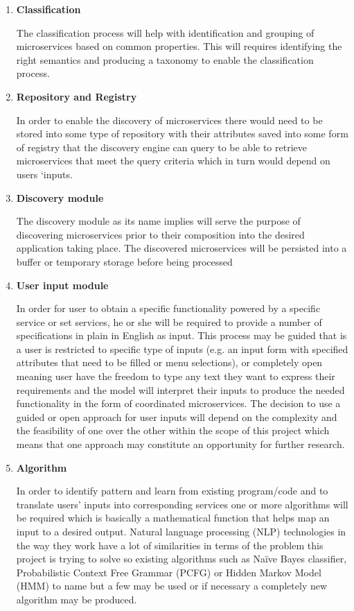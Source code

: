 \documentclass{article}
\begin{document}
\begin{enumerate}

\item \textbf{Classification}

The classification process will help with identification and grouping of microservices based on common properties. This will requires identifying the right semantics and producing a taxonomy to enable the classification process. 


\item \textbf{Repository and Registry}


In order to enable the discovery of microservices there would need to be stored into some type of repository with their attributes saved into some form of registry that the discovery engine can query to be able to retrieve microservices that meet the query criteria which in turn would depend on users ‘inputs. 


\item \textbf{Discovery module}


The discovery module as its name implies will serve the purpose of discovering microservices prior to their composition into the desired application taking place. The discovered microservices will be persisted into a buffer or temporary storage before being processed 


\item \textbf{User input module}


In order for user to obtain a specific functionality powered by a specific service or set services, he or she will be required to provide a number of specifications in plain in English as input. This process may be guided that is a user is restricted to specific type of inputs (e.g. an input form with specified attributes that need to be filled or menu selections), or completely open meaning user have the freedom to type any text they want to express their requirements and the model will interpret their inputs to produce the needed functionality in the form of coordinated microservices. The decision to use a guided or open approach for user inputs will depend on the complexity and the feasibility of one over the other within the scope of this project which means that one approach may constitute an opportunity for further research.


\item \textbf{Algorithm}


In order to identify pattern and learn from existing program/code and to translate users’ inputs into corresponding services one or more algorithms will be required which is basically a mathematical function that helps map an input to a desired output. Natural language processing (NLP) technologies in the way they work have a lot of similarities in terms of the problem this project is trying to solve so existing algorithms such as Naïve Bayes classifier, Probabilistic Context Free Grammar (PCFG) or Hidden Markov Model (HMM) to name but a few may be used or if necessary a completely new algorithm may be produced.



\end{enumerate}
\end{document}

